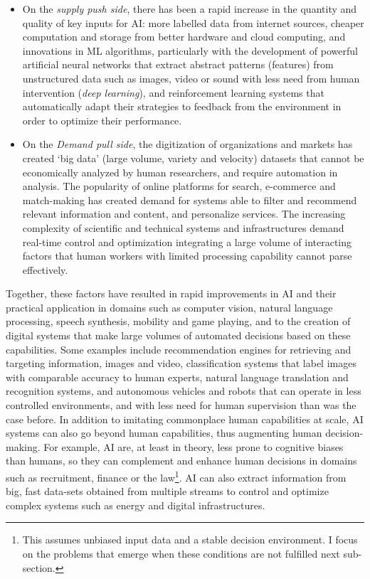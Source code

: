 \documentclass[11pt]{article}
\begin{document}
\begin{itemize}
    \item On the \textit{supply push side}, there has been a rapid increase in the quantity and quality of key inputs for AI: more labelled data from internet sources, cheaper computation and storage from better hardware and cloud computing, and innovations in ML algorithms, particularly with the development of powerful artificial neural networks that extract abstract patterns (features) from unstructured data such as images, video or sound with less need from human intervention (\textit{deep learning}), and reinforcement learning systems that automatically adapt their strategies to feedback from the environment in order to optimize their performance. 
    \item On the \textit{Demand pull side}, the digitization of organizations and markets has created `big data' (large volume, variety and velocity) datasets that cannot be economically analyzed by human researchers, and require automation in analysis. The popularity of online platforms for search, e-commerce and match-making has created demand for systems able to filter and recommend relevant information and content, and personalize services. The increasing complexity of scientific and technical systems and infrastructures demand real-time control and optimization integrating a large volume of interacting factors that human workers with limited processing capability cannot parse effectively.
\end{itemize}

Together, these factors have resulted in rapid improvements in AI and their practical application in domains such as computer vision, natural language processing, speech synthesis, mobility and game playing, and to the creation of digital systems that make large volumes of automated decisions based on these capabilities. Some examples include recommendation engines for retrieving and targeting information, images and video, classification systems that label images with comparable accuracy to human experts, natural language translation and recognition systems, and autonomous vehicles and robots that can operate in less controlled environments, and with less need for human supervision than was the case before. In addition to imitating commonplace human capabilities at scale, AI systems can also go beyond human capabilities, thus augmenting human decision-making. For example, AI are, at least in theory, less prone to cognitive biases than humans, so they can complement and enhance human decisions in domains such as recruitment, finance or the law\footnote{This assumes unbiased input data and a stable decision environment. I focus on the problems that emerge when these conditions are not fulfilled next sub-section.}. AI can also extract information from big, fast data-sets obtained from multiple streams to control and optimize complex systems such as energy and digital infrastructures.
\end{document}
